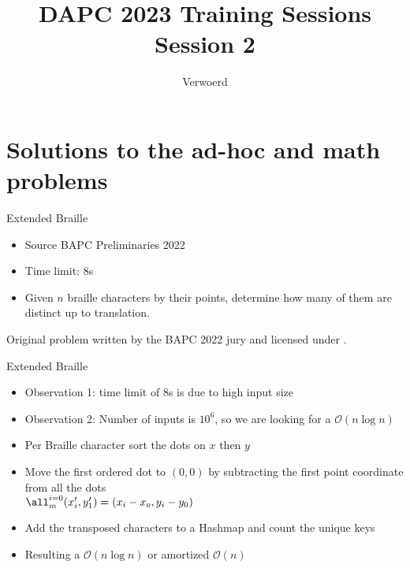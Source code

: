 \documentclass[11pt,pdf, aspectratio=169]{beamer}
\title{DAPC 2023 Training Sessions\\Session 2}
\author{Verwoerd}
\begin{document}
  \maketitle


  \section{Solutions to the ad-hoc and math problems}
  \begin{frame}{Extended Braille}
    \begin{itemize}
      \item Source BAPC Preliminaries 2022
      \item Time limit: 8s
      \item Given $n$ braille characters by their points, determine how many of them are distinct up to translation.
    \end{itemize}
    Original problem written by the BAPC 2022 jury and licensed under \doclicenseLongNameRef.

    \doclicenseImage

  \end{frame}
  \begin{frame}{Extended Braille}
    \begin{itemize}
      \item Observation 1: time limit of 8s is due to high input size
      \item Observation 2: Number of inputs is $10^6$, so we are looking for a $\mathcal{O}(n\log{}n)$
      \item Per Braille character sort the dots on $x$ then $y$
      \item Move the first ordered dot to $(0, 0)$ by subtracting the first point coordinate from all the dots\\
      $\all^{i=0}_m (x'_i, y'_1) = (x_i - x_o, y_i - y_0)$
      \item Add the transposed characters to a Hashmap and count the unique keys
      \item Resulting a $\mathcal{O}(n\log{}n)$ or amortized $\mathcal{O}(n)$
    \end{itemize}
  \end{frame}
\end{document}
